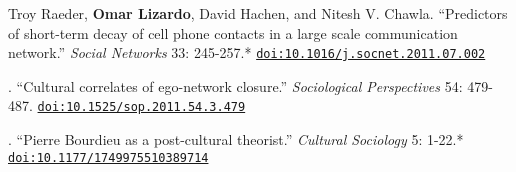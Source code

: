 
\ind Troy Raeder, {\bf Omar Lizardo}, David Hachen, and Nitesh V. Chawla. ``Predictors of short-term decay of cell phone contacts in a large scale communication network.'' {\em Social Networks} 33: 245-257.\textcolor{uclablue}{*} \href{https://doi.org/10.1016/j.socnet.2011.07.002}{\nolinkurl{doi:10.1016/j.socnet.2011.07.002}}

. ``Cultural correlates of ego-network closure.''  {\em Sociological Perspectives} 54: 479-487. \href{https://doi.org/10.1525/sop.2011.54.3.479}{\nolinkurl{doi:10.1525/sop.2011.54.3.479}}

. ``Pierre Bourdieu as a post-cultural theorist.''  {\em Cultural Sociology} 5: 1-22.\textcolor{uclablue}{*} \href{https://doi.org/10.1177/1749975510389714}{\nolinkurl{doi:10.1177/1749975510389714}}